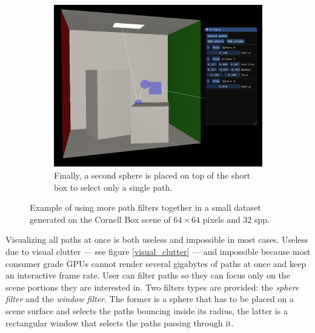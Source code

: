 \begin{figure}
	\begin{subfigure}[t]{0.49\linewidth}
		\includegraphics[width=\textwidth]{chapters/chapter_thetool/filterscombination3.pdf}
		\caption{Finally, a second sphere is placed on top of the short box to select only a single path.}
	\end{subfigure}

	\caption{Example of using more path filters together in a small dataset generated on the Cornell Box scene of $64 \times 64$ pixels and 32 spp.}
	\label{filterstack}
\end{figure}

Visualizing all paths at once is both useless and impossible in most cases. Useless due to visual clutter --- see figure \ref{visual_clutter} --- and impossible because most consumer grade GPUs cannot render several gigabytes of paths at once and keep an interactive frame rate.
User can filter paths so they can focus only on the scene portions they are interested in. Two filters types are provided: the \textit{sphere filter} and the \textit{window filter}. The former is a sphere that has to be placed on a scene surface and selects the paths bouncing inside its radius, the latter is a rectangular window that selects the paths passing through it.

